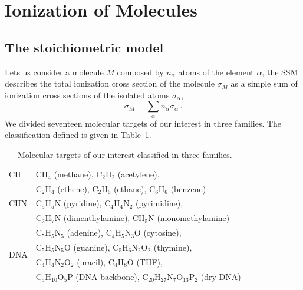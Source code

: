 \documentclass[preprint,12pt]{article}
\begin{document}
\section{Ionization of Molecules}
\subsection{The stoichiometric model}

Lets us consider a molecule $M$ composed by $n_{\alpha}$ atoms of the
element $\alpha$, the SSM describes the total ionization cross section 
of the molecule $\sigma_{M}$ as a simple sum of ionization cross 
sections of the isolated atoms $\sigma_{\alpha}$, 
\begin{equation}
 \sigma_{M}=\sum\limits_{\alpha}n_{\alpha}\sigma_{\alpha}\,.  
 \label{eq:sumion}
\end{equation}
We divided seventeen molecular targets of our interest in three families. 
The classification defined is given in Table~\ref{tab:families}.

\begin{table}[H]
\begin{center}
\begin{tabular}{|p{}|p{}|}
\hline
 CH  & CH$_4$ (methane), C$_2$H$_2$ (acetylene), \\
     & C$_2$H$_4$ (ethene), C$_2$H$_6$ (ethane), C$_6$H$_6$ (benzene) \\
\hline
 CHN & C$_5$H$_5$N (pyridine), C$_4$H$_4$N$_2$ (pyrimidine), \\
& C$_2$H$_7$N 
(dimenthylamine), CH$_5$N (monomethylamine) \\
\hline
 \multirow{4}{*}{DNA} 
     & C$_5$H$_5$N$_5$ (adenine), C$_4$H$_5$N$_3$O (cytosine), \\
     & C$_5$H$_5$N$_5$O (guanine), C$_5$H$_6$N$_2$O$_2$ (thymine), \\
     & C$_4$H$_4$N$_2$O$_2$ (uracil), C$_4$H$_8$O (THF), \\
     & C$_5$H$_{10}$O$_5$P (DNA backbone), C$_{20}$H$_{27}$N$_7$O$_{13}$P$_2$ (dry DNA) \\
\hline
\end{tabular}
\caption{Molecular targets of our interest classified in three families.}
\label{tab:families}
\end{center}
\end{table}
\end{document}
